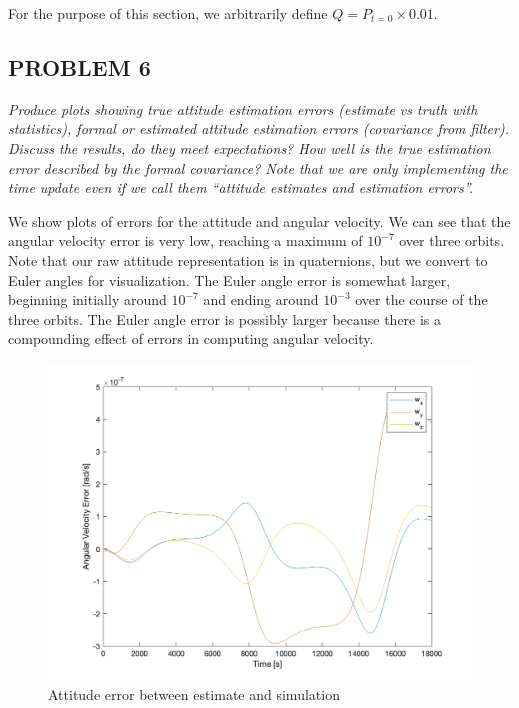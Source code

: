 For the purpose of this section, we arbitrarily define $Q = P_{t=0} \times 0.01$.

\subsection{PROBLEM 6}
\textit{Produce plots showing true attitude estimation errors (estimate vs truth with statistics), formal or estimated attitude estimation errors (covariance from filter). Discuss the results, do they meet expectations? How well is the true estimation error described by the formal covariance? Note that we are only implementing the time update even if we call them “attitude estimates and estimation errors”.}

We show plots of errors for the attitude and angular velocity. We can see that the angular velocity error is very low, reaching a maximum of $10^{-7}$ over three orbits. Note that our raw attitude representation is in quaternions, but we convert to Euler angles for visualization. The Euler angle error is somewhat larger, beginning initially around $10^{-7}$ and ending around $10^{-3}$ over the course of the three orbits. The Euler angle error is possibly larger because there is a compounding effect of errors in computing angular velocity.

\begin{figure}[H]
\centering
\includegraphics[scale=0.6]{Images/ps7_problem6_angvel_err.png}
\caption{Attitude error between estimate and simulation}
\label{fig:ps7_problem6_angvel_err}
\end{figure}

